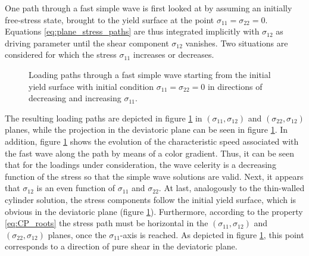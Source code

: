One path through a fast simple wave is first looked at by assuming an initially free-stress state, brought to the yield surface at the point $ \sigma_{11}=\sigma_{22}=0 $.
Equations \eqref{eq:plane_stress_paths} are thus integrated implicitly with $\sigma_{12}$ as driving parameter until the shear component $\sigma_{12}$ vanishes.
Two situations are considered for which the stress $\sigma_{11}$ increases or decreases.
\begin{figure}[h!]
  \centering
  \caption{Loading paths through a fast simple wave starting from the initial yield surface with initial condition $\sigma_{11}=\sigma_{22}=0 $ in directions of decreasing and increasing $\sigma_{11} $.}
  \label{fig:fast_path_plane_stress}
\end{figure}
The resulting loading paths are depicted in figure \ref{fig:fast_path_plane_stress} in $(\sigma_{11},\sigma_{12})$ and $(\sigma_{22},\sigma_{12})$ planes, while the projection in the deviatoric plane can be seen in figure \ref{fig:fast_path_plane_stress}.
In addition, figure \ref{fig:fast_path_plane_stress} shows the evolution of the characteristic speed associated with the fast wave along the path by means of a color gradient.
Thus, it can be seen that for the loadings under consideration, the wave celerity is a decreasing function of the stress so that the simple wave solutions are valid.
Next, it appears that $\sigma_{12}$ is an even function of $\sigma_{11}$ and $\sigma_{22}$. %
At last, analogously to the thin-walled cylinder solution, the stress components follow the initial yield surface, which is obvious in the deviatoric plane (figure \ref{fig:fast_path_plane_stress}).
Furthermore, according to the property \eqref{eq:CP_roots} the stress path must be horizontal in the $(\sigma_{11},\sigma_{12})$ and $(\sigma_{22},\sigma_{12})$ planes, once the $\sigma_{11}$-axis is reached.
As depicted in figure \ref{fig:fast_path_plane_stress}, this point corresponds to a direction of pure shear in the deviatoric plane.
